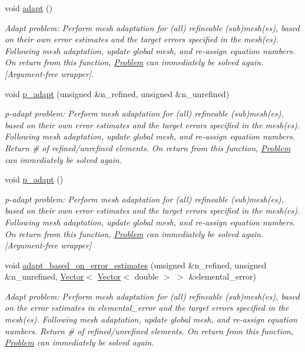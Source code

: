 \begin{DoxyCompactItemize}
void \hyperlink{classoomph_1_1Problem_a0b9e09ddfa2411f14fc723c3207decd1}{adapt} ()
\begin{DoxyCompactList}\small\item\em Adapt problem\+: Perform mesh adaptation for (all) refineable (sub)mesh(es), based on their own error estimates and the target errors specified in the mesh(es). Following mesh adaptation, update global mesh, and re-\/assign equation numbers. On return from this function, \hyperlink{classoomph_1_1Problem}{Problem} can immediately be solved again. \mbox{[}Argument-\/free wrapper\mbox{]}. \end{DoxyCompactList}\item 
void \hyperlink{classoomph_1_1Problem_a1303b2fde2fe84b71519cadabc18f868}{p\+\_\+adapt} (unsigned \&n\+\_\+refined, unsigned \&n\+\_\+unrefined)
\begin{DoxyCompactList}\small\item\em p-\/adapt problem\+: Perform mesh adaptation for (all) refineable (sub)mesh(es), based on their own error estimates and the target errors specified in the mesh(es). Following mesh adaptation, update global mesh, and re-\/assign equation numbers. Return \# of refined/unrefined elements. On return from this function, \hyperlink{classoomph_1_1Problem}{Problem} can immediately be solved again. \end{DoxyCompactList}\item 
void \hyperlink{classoomph_1_1Problem_aaad4443f87f3f3affe53fa9160802e7c}{p\+\_\+adapt} ()
\begin{DoxyCompactList}\small\item\em p-\/adapt problem\+: Perform mesh adaptation for (all) refineable (sub)mesh(es), based on their own error estimates and the target errors specified in the mesh(es). Following mesh adaptation, update global mesh, and re-\/assign equation numbers. On return from this function, \hyperlink{classoomph_1_1Problem}{Problem} can immediately be solved again. \mbox{[}Argument-\/free wrapper\mbox{]} \end{DoxyCompactList}\item 
void \hyperlink{classoomph_1_1Problem_a291f1a2b3cb65743355ec1e0cdcb7f48}{adapt\+\_\+based\+\_\+on\+\_\+error\+\_\+estimates} (unsigned \&n\+\_\+refined, unsigned \&n\+\_\+unrefined, \hyperlink{classoomph_1_1Vector}{Vector}$<$ \hyperlink{classoomph_1_1Vector}{Vector}$<$ double $>$ $>$ \&elemental\+\_\+error)
\begin{DoxyCompactList}\small\item\em Adapt problem\+: Perform mesh adaptation for (all) refineable (sub)mesh(es), based on the error estimates in elemental\+\_\+error and the target errors specified in the mesh(es). Following mesh adaptation, update global mesh, and re-\/assign equation numbers. Return \# of refined/unrefined elements. On return from this function, \hyperlink{classoomph_1_1Problem}{Problem} can immediately be solved again. \end{DoxyCompactList}\item 

\end{DoxyCompactItemize}
